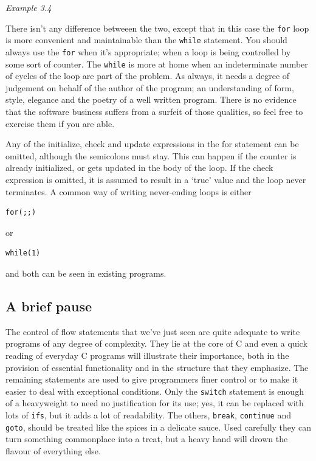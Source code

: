    \begin{center}\textit{Example 3.4}\end{center}


   There isn't any difference betweeen the two, except that in this case
    the \texttt{for} loop is more convenient and maintainable than the
    \texttt{while} statement. You should always use the \texttt{for}
    when it's appropriate; when a loop is being controlled by some sort of
    counter. The \texttt{while} is more at home when an indeterminate
    number of cycles of the loop are part of the problem. As always, it needs
    a degree of judgement on behalf of the author of the program; an
    understanding of form, style, elegance and the poetry of a well written
    program. There is no evidence that the software business suffers from a
    surfeit of those qualities, so feel free to exercise them if you are
    able.


   Any of the initialize, check and update expressions in the for statement
    can be omitted, although the semicolons must stay. This can happen if the
    counter is already initialized, or gets updated in the body of the loop.
    If the check expression is omitted, it is assumed to result in a
    `true' value and the loop never terminates. A common way of writing
    never-ending loops is either


   \begin{Verbatim}
for(;;)
\end{Verbatim}

   or


   \begin{Verbatim}
while(1)
\end{Verbatim}

   and both can be seen in existing programs.


  

  \subsection{A brief pause }
   

   The control of flow statements that we've just seen are quite adequate
    to write programs of any degree of complexity. They lie at the core
    of C and even a quick reading of everyday C programs will
    illustrate their importance, both in the provision of essential
    functionality and in the structure that they emphasize. The remaining
    statements are used to give programmers finer control or to make it easier
    to deal with exceptional conditions. Only the \texttt{switch}
    statement is enough of a heavyweight to need no justification for its use;
    yes, it can be replaced with lots of \texttt{ifs}, but it adds a lot
    of readability. The others, \texttt{break}, \texttt{continue} and
    \texttt{goto}, should be treated like the spices in a delicate sauce.
    Used carefully they can turn something commonplace into a treat, but a
    heavy hand will drown the flavour of everything else.



